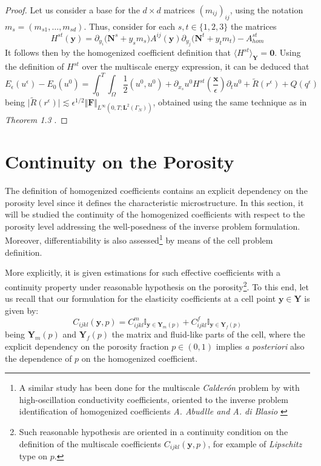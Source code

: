 \begin{proof}
Let us consider a base for the $d\times d$ matrices $(m_{ij})_{ij}$, using the notation $m_s = (m_{s1}, \dots, m_{sd})$. Thus, consider for each $s, t \in \{1,2,3\}$ the matrices 
\begin{equation*}
    H^{st}(\mathbf{y}) = \partial_{y_i}\big(\mathbf{N}^s + y_s m_s\big) A^{ij}(\mathbf{y}) \partial_{y_j} \big(\mathbf{N}^t +  y_t m_t\big) - A^{st}_{hom}
\end{equation*}
It follows then by the homogenized coefficient definition that $\langle H^{st} \rangle_{\mathbf{Y}} = \mathbf{0}$.
Using the definition of $H^{st}$ over the multiscale energy expression, it can be deduced that
\begin{equation*}
    E_{\epsilon}(u^{\epsilon}) - E_{0}(u^{0}) = \int_0^T \int_{\Omega} \frac{1}{2}(u^0, u^0) + \partial_{x_s}u^0 H^{st}(\frac{\mathbf{x}}{\epsilon}) \partial_{t}u^0  + \tilde{R}(r^{\epsilon}) + Q(q^{\epsilon})
\end{equation*}
being $\vert \tilde{R}(r^{\epsilon})\vert \lesssim \epsilon^{1/2}\Vert \mathbf{F} \Vert_{L^{\infty}(0,T;\mathbf{L}^2(\Gamma_N))}$, obtained using the same technique as in \textit{Theorem 1.3} \cite{oleinik1992mathematical}.
\end{proof}

\section{Continuity on the Porosity}
The definition of homogenized coefficients contains an explicit dependency on the porosity level since it defines the characteristic microstructure. In this section, it will be studied the continuity of the homogenized coefficients with respect to the porosity level addressing the well-posedness of the inverse problem formulation. Moreover, differentiability is also assessed\footnote{A similar study has been done for the multiscale \textit{Calderón} problem by with high-oscillation conductivity coefficients, oriented to the inverse problem identification of homogenized coefficients \textit{A. Abudlle and A. di Blasio} \cite{Abdulle:221051}} by means of the cell problem definition. 

More explicitly, it is given estimations for such effective coefficients with a continuity property under reasonable hypothesis on the porosity\footnote{Such reasonable hypothesis are oriented in a continuity condition on the definition of the multiscale coefficients $C_{ijkl}(\mathbf{y},p)$, for example of \textit{Lipschitz} type on $p$.}. To this end, let us recall that our formulation for the elasticity coefficients at a cell point $\mathbf{y}\in \mathbf{Y}$ is given by:
\begin{equation*}
    C_{ijkl}(\mathbf{y}, p) = C_{ijkl}^{m} \mathbb{I}_{\mathbf{y} \in \mathbf{Y}_m(p)} + C_{ijkl}^{f} \mathbb{I}_{\mathbf{y} \in \mathbf{Y}_f(p)}
\end{equation*}
being $\mathbf{Y}_m(p)$ and $\mathbf{Y}_f(p)$ the matrix and fluid-like parts of the cell, where the explicit dependency on the porosity fraction $p \in (0,1)$ implies \textit{a posteriori} also the dependence of $p$ on the homogenized coefficient.

